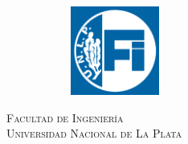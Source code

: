 \begin{titlepage}
\begin{center}
\begin{figure}[H]
\begin{subfigure}
                \end{subfigure}
                \begin{subfigure}
                    \centering
                    \includegraphics[width=0.32\textwidth]{Imagenes/FI Invertido.png}
                \end{subfigure}
            \end{figure}
            \vspace{1cm}
            \SemiBold\scshape
            Facultad de Ingeniería
            \\
            \vspace{0.1cm}
            Universidad Nacional de La Plata
            \vspace{1cm}
        \end{center}
    \end{titlepage}
